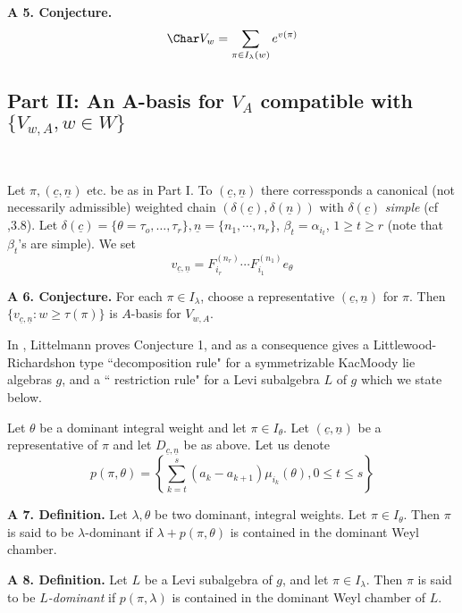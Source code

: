 \medskip
\noindent
{\bfseries A 5. Conjecture.}\label{A. 5. Conjecture.}
$$
\Char V_{w}= \sum_{\pi \in I_{\lambda}(w)} e^{v(\pi)}
$$

\medskip
\subsection*{Part II: An A-basis for $V_{A}$ compatible with $\{V_{w,A}, w \in W\}$}
~

Let $\pi,(\underline{c}, \underline{n})$ etc. be as in Part I. To $(\underline{c}, \underline{n})$ there corressponds a canonical (not necessarily admissible) weighted chain $(\delta(\underline{c}), \delta(\underline{n}))$ with $\delta(\underline{c})$ \textit{simple} (cf \cite{art10-keyLa},3.8). Let $\delta(\underline{c}) = \{\theta = \tau_{o}, \ldots, \tau_{r}\}, \underline{n}= \{n_{1}, \cdots, n_{r}\}$, $\beta_{t} = \alpha_{i_{t}}$, $1 \geq t \geq r$ (note that $\beta_{t}$'s are simple). We set
$$
v_{\underline{c}, \underline{n}} = F_{i_{r}}^{(n_{r})}\cdots F_{i_{1}}^{(n_{1})}e_{\theta}
$$ 

\medskip
\noindent
{\bfseries A 6. Conjecture.}\label{A. 6. Conjecture.} For each $\pi \in I_{\lambda}$, choose a representative $(\underline{c}, \underline{n})$ for $\pi$. Then $\{v_{\underline{c}, \underline{n}}: w \geq \tau (\pi)\}$ is $A$-basis for $V_{w, A}$.

In \cite{art10-keyLi}, Littelmann proves Conjecture 1, and as a consequence gives a Littlewood-Richardshon type ``decomposition rule" for a symmetrizable KacMoody lie algebras $g$, and a `` restriction rule" for a Levi subalgebra $L$ of $g$ which we state below.

Let $\theta$ be a dominant integral weight and let $\pi \in I_{\theta}$. Let $(\underline{c}, \underline{n})$ be a representative of $\pi$ and let $D_{\underline{c}, \underline{n}}$ be as above. Let us denote
$$
p(\pi, \theta) = \left\{\sum\limits_{k=t}^{s}(a_{k}-a_{k+1})\mu_{i_{k}}(\theta), 0 \leq t \leq s \right\}
$$

\medskip
\noindent
{\bfseries A 7. Definition.}\label{A. 7. Definition.} Let $\lambda, \theta$ be two dominant, integral weights. Let $\pi \in I_{\theta}$. Then $\pi$ is said to be $\lambda$-dominant if $\lambda + p(\pi, \theta)$ is contained in the dominant Weyl chamber.

\medskip
\noindent
{\bfseries A 8. Definition.}\label{A. 8. Definition.} Let $L$ be a Levi subalgebra of $g$, and let $\pi \in I_{\lambda}$.  Then $\pi$ is said to be \textit{$L$-dominant} if $p(\pi, \lambda)$ is contained in the dominant Weyl chamber of $L$. 


